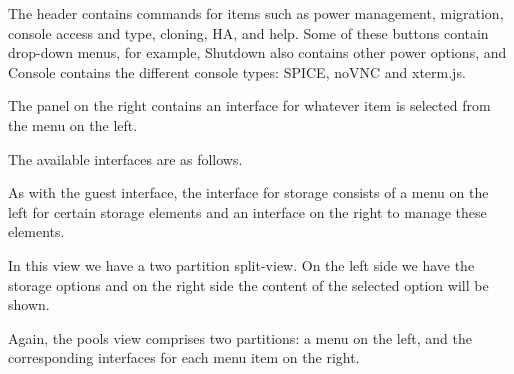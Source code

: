 The header contains commands for items such as power management, migration, console access and type, cloning, HA, and help. Some of these buttons contain drop-down menus, for example, Shutdown also contains other power options, and Console contains the different console types: SPICE, noVNC and xterm.js.

The panel on the right contains an interface for whatever item is selected from the menu on the left.

The available interfaces are as follows.

As with the guest interface, the interface for storage consists of a menu on the left for certain storage elements and an interface on the right to manage these elements.

In this view we have a two partition split-view. On the left side we have the storage options and on the right side the content of the selected option will be shown.

Again, the pools view comprises two partitions: a menu on the left, and the corresponding interfaces for each menu item on the right.

